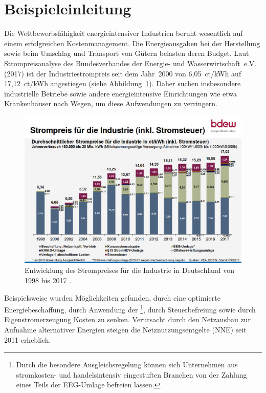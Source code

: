 \section{Beispieleinleitung}
\label{sec:example_intro}
Die Wettbewerbsfähigkeit energieintensiver Industrien beruht wesentlich auf einem erfolgreichen Kostenmanagement.
Die Energieausgaben bei der Herstellung sowie beim Umschlag und Transport von Gütern belasten deren Budget.
Laut Strompreisanalyse des Bundesverbandes der Energie- und Wasserwirtschaft~e.V. (2017) ist der Industriestrompreis seit dem Jahr~2000 von 6,05~ct/kWh auf 17,12~ct/kWh angestiegen (siehe Abbildung~\ref{fig:Strompr}).
Daher suchen insbesondere industrielle Betriebe sowie andere energieintensive Einrichtungen wie etwa Krankenhäuser nach Wegen, um diese Aufwendungen zu verringern.
\begin{figure}[b!]
	\centering
		\includegraphics[width=\textwidth]{img_examples/BDEWStrompreis.png}
		\caption[Strompreisentwicklung BDEW]{Entwicklung des Strompreises für die Industrie in Deutschland von 1998 bis 2017 \cite{BDEWMai17}.		}
		\label{fig:Strompr}
\end{figure}
Beispielsweise wurden Möglichkeiten gefunden, durch eine optimierte Energiebeschaffung, durch Anwendung der  \footnote{Durch die besondere Ausgleichsregelung können sich Unternehmen aus stromkosten- und handelsintensiv eingestuften Branchen von der Zahlung eines Teils der EEG-Umlage befreien lassen.}, durch Steuerbefreiung sowie durch Eigenstromerzeugung Kosten zu senken.
Verursacht durch den Netzausbau zur Aufnahme alternativer Energien steigen die Netznutzungsentgelte (NNE) seit 2011 erheblich.

